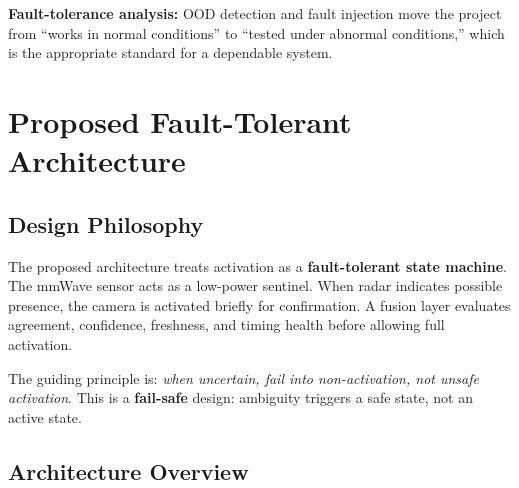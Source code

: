 \documentclass[12pt]{extarticle}
\begin{document}
\textbf{Fault-tolerance analysis:}
OOD detection and fault injection move the project from ``works in normal conditions''
to ``tested under abnormal conditions,'' which is the appropriate standard for a
dependable system.

\section{Proposed Fault-Tolerant Architecture}
\label{sec:arch}

\subsection{Design Philosophy}

The proposed architecture treats activation as a \textbf{fault-tolerant state machine}.
The mmWave sensor acts as a low-power sentinel.
When radar indicates possible presence, the camera is activated briefly for
confirmation.
A fusion layer evaluates agreement, confidence, freshness, and timing health before
allowing full activation.

The guiding principle is: \emph{when uncertain, fail into non-activation, not unsafe
activation}.
This is a \textbf{fail-safe} design: ambiguity triggers a safe state, not an active
state.

\subsection{Architecture Overview}
\end{document}
